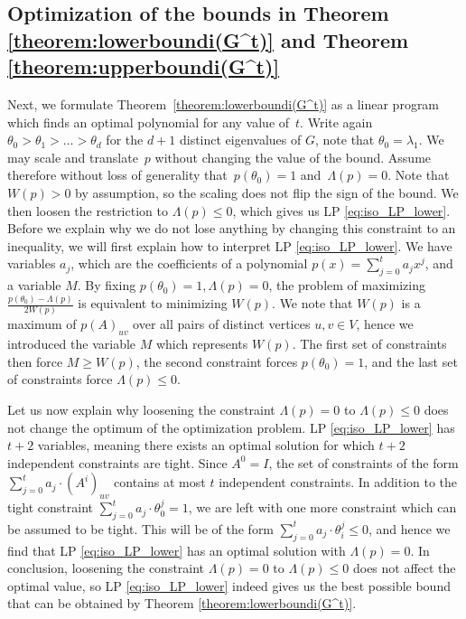 \documentclass[a4paper,11pt]{article}
\theoremstyle{definition}
\begin{document}
\subsection{Optimization of the bounds in Theorem \ref{theorem:lowerboundi(G^t)} and Theorem \ref{theorem:upperboundi(G^t)}}
Next, we formulate Theorem~\ref{theorem:lowerboundi(G^t)} as a linear program which finds an optimal polynomial for any value of~$t$. Write again $\theta_0>\theta_1>\dots>\theta_d$ for the $d+1$ distinct eigenvalues of $G$, note that $\theta_0=\lambda_1$. We may scale and translate~$p$ without changing the value of the bound. Assume therefore without loss of generality that~$p(\theta_0)=1$ and~$\Lambda(p)=0$. Note that~$W(p)>0$ by assumption, so the scaling does not flip the sign of the bound. We then loosen the restriction to $\Lambda(p) \leq 0$, which gives us LP \eqref{eq:iso_LP_lower}. Before we explain why we do not lose anything by changing this constraint to an inequality, we will first explain how to interpret LP \eqref{eq:iso_LP_lower}. We have variables $a_j$, which are the coefficients of a polynomial $p(x) = \sum_{j=0}^t a_jx^j$, and a variable $M$. By fixing $p(\theta_0)=1,\Lambda(p)=0$, the problem of maximizing $\frac{p(\theta_0)-\Lambda(p)}{2W(p)}$ is equivalent to minimizing $W(p)$. We note that $W(p)$ is a maximum of $p(A)_{uv}$ over all pairs of distinct vertices $u,v \in V$, hence we introduced the variable $M$ which represents $W(p)$. The first set of constraints then force $M \geq W(p)$, the second constraint forces $p(\theta_0) =1$, and the last set of constraints force $\Lambda(p) \leq 0$. 

Let us now explain why loosening the constraint $\Lambda(p)=0$ to $\Lambda(p) \leq 0$ does not change the optimum of the optimization problem. LP \eqref{eq:iso_LP_lower} has $t+2$ variables, meaning there exists an optimal solution for which $t+2$ independent constraints are tight. Since $A^0 = I$, the set of constraints of the form $\sum_{j = 0}^t a_j \cdot (A^i)_{uv}$ contains at most $t$ independent constraints. In addition to the tight constraint $\sum_{j = 0}^t a_j \cdot \theta_0^j = 1$, we are left with one more constraint which can be assumed to be tight. This will be of the form $ \sum_{j = 0}^t a_j \cdot \theta_i^j \leq 0$, and hence we find that LP \eqref{eq:iso_LP_lower} has an optimal solution with $\Lambda(p)= 0$. In conclusion, loosening the constraint $\Lambda(p)=0$ to $\Lambda(p) \leq 0$ does not affect the optimal value, so LP \eqref{eq:iso_LP_lower} indeed gives us the best possible bound that can be obtained by Theorem \ref{theorem:lowerboundi(G^t)}.
\end{document}
